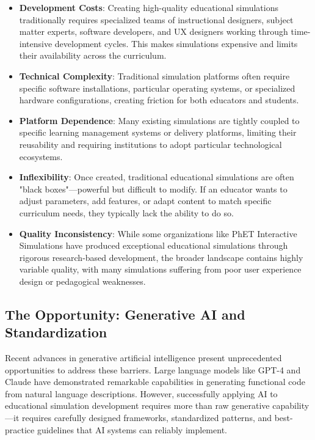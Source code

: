 \begin{itemize}
\item \textbf{Development Costs}: Creating high-quality educational simulations traditionally requires specialized teams of instructional designers, subject matter experts, software developers, and UX designers working through time-intensive development cycles. This makes simulations expensive and limits their availability across the curriculum.

\item \textbf{Technical Complexity}: Traditional simulation platforms often require specific software installations, particular operating systems, or specialized hardware configurations, creating friction for both educators and students.

\item \textbf{Platform Dependence}: Many existing simulations are tightly coupled to specific learning management systems or delivery platforms, limiting their reusability and requiring institutions to adopt particular technological ecosystems.

\item \textbf{Inflexibility}: Once created, traditional educational simulations are often "black boxes"—powerful but difficult to modify. If an educator wants to adjust parameters, add features, or adapt content to match specific curriculum needs, they typically lack the ability to do so.

\item \textbf{Quality Inconsistency}: While some organizations like PhET Interactive Simulations \cite{phet2023} have produced exceptional educational simulations through rigorous research-based development, the broader landscape contains highly variable quality, with many simulations suffering from poor user experience design or pedagogical weaknesses.
\end{itemize}

\subsection{The Opportunity: Generative AI and Standardization}

Recent advances in generative artificial intelligence present unprecedented opportunities to address these barriers. Large language models like GPT-4 and Claude have demonstrated remarkable capabilities in generating functional code from natural language descriptions. However, successfully applying AI to educational simulation development requires more than raw generative capability—it requires carefully designed frameworks, standardized patterns, and best-practice guidelines that AI systems can reliably implement.

